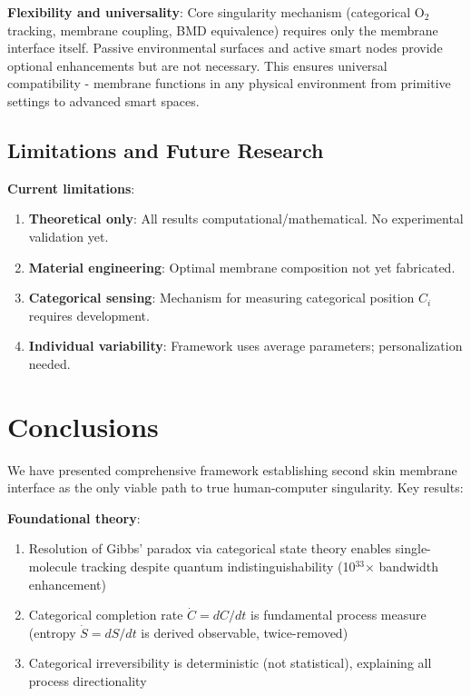 \documentclass[11pt,a4paper]{article}
\theoremstyle{definition}
\theoremstyle{remark}
\begin{document}
\textbf{Flexibility and universality}: Core singularity mechanism (categorical O$_2$ tracking, membrane coupling, BMD equivalence) requires only the membrane interface itself. Passive environmental surfaces and active smart nodes provide optional enhancements but are not necessary. This ensures universal compatibility - membrane functions in any physical environment from primitive settings to advanced smart spaces.

\subsection{Limitations and Future Research}

\textbf{Current limitations}:
\begin{enumerate}
\item \textbf{Theoretical only}: All results computational/mathematical. No experimental validation yet.
\item \textbf{Material engineering}: Optimal membrane composition not yet fabricated.
\item \textbf{Categorical sensing}: Mechanism for measuring categorical position $C_i$ requires development.
\item \textbf{Individual variability}: Framework uses average parameters; personalization needed.
\end{enumerate}

\section{Conclusions}

We have presented comprehensive framework establishing second skin membrane interface as the only viable path to true human-computer singularity. Key results:

\textbf{Foundational theory}:
\begin{enumerate}
\item Resolution of Gibbs' paradox via categorical state theory enables single-molecule tracking despite quantum indistinguishability (10$^{33}$× bandwidth enhancement)
\item Categorical completion rate $\dot{C} = dC/dt$ is fundamental process measure (entropy $\dot{S} = dS/dt$ is derived observable, twice-removed)
\item Categorical irreversibility is deterministic (not statistical), explaining all process directionality
\end{enumerate}
\end{document}
